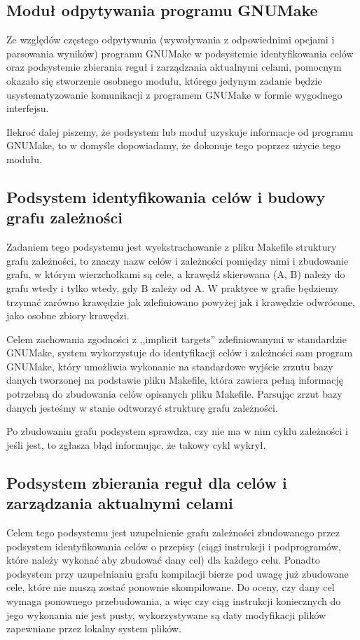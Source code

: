 \documentclass[a4paper]{article}
\begin{document}
\subsection{Moduł odpytywania programu GNUMake}

Ze względów częstego odpytywania (wywoływania z odpowiednimi opcjami i parsowania wyników) programu GNUMake w podsystemie identyfikowania celów oraz podsystemie zbierania reguł i zarządzania aktualnymi celami, pomocnym okazało się stworzenie osobnego modułu, którego jedynym zadanie będzie usystematyzowanie komunikacji z programem GNUMake w formie wygodnego interfejsu.

Ilekroć dalej piszemy, że podsystem lub moduł uzyskuje informacje od programu GNUMake, to w domyśle dopowiadamy, że dokonuje tego poprzez użycie tego modułu.

\subsection{Podsystem identyfikowania celów i budowy grafu zależności}

Zadaniem tego podsystemu jest wyekstrachowanie z pliku Makefile struktury grafu zależności, to znaczy nazw celów i zależności pomiędzy nimi i zbudowanie grafu, w którym wierzchołkami są cele, a krawędź skierowana (A, B) należy do grafu wtedy i tylko wtedy, gdy B zależy od A.
W praktyce w grafie będziemy trzymać zarówno krawędzie jak zdefiniowano powyżej jak i krawędzie odwrócone, jako osobne zbiory krawędzi.

Celem zachowania zgodności z ,,implicit targets'' zdefiniowanymi w standardzie GNUMake, system wykorzystuje do identyfikacji celów i zależności sam program GNUMake, który umożliwia wykonanie na standardowe wyjście zrzutu bazy danych tworzonej na podstawie pliku Makefile, która zawiera pełną informację potrzebną do zbudowania celów opisanych pliku Makefile.
Parsując zrzut bazy danych jesteśmy w stanie odtworzyć strukturę grafu zależności.

Po zbudowaniu grafu podsystem sprawdza, czy nie ma w nim cyklu zależności i jeśli jest, to zgłasza błąd informując, że takowy cykl wykrył.

\subsection{Podsystem zbierania reguł dla celów i zarządzania aktualnymi celami}

Celem tego podsystemu jest uzupełnienie grafu zależności zbudowanego przez podsystem identyfikowania celów o przepisy (ciągi instrukcji i podprogramów, które należy wykonać aby zbudować dany cel) dla każdego celu.
Ponadto podsystem przy uzupełnianiu grafu kompilacji bierze pod uwagę już zbudowane cele, które nie muszą zostać ponownie skompilowane. Do oceny, czy dany cel wymaga ponownego przebudowania, a więc czy ciąg instrukcji koniecznych do jego wykonania nie jest pusty, wykorzystywane są daty modyfikacji plików zapewniane przez lokalny system plików.
\end{document}
